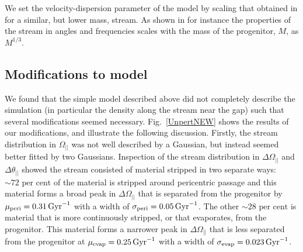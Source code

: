 \documentclass[useAMS,usenatbib,fleqn,a4paper]{mn2e}
\def\Gyr{\,{\rm Gyr}}
\def\percent{\text{ per cent}}
\def\percent{\text{ per cent}}
\begin{document}
We set the velocity-dispersion parameter of the model by scaling that obtained in \cite{Bovy2014} for a similar, but lower mass, stream. As shown in \cite{SandersBinney2013a} for instance the properties of the stream in angles and frequencies scales with the mass of the progenitor, $M$, as $M^{1/3}$.

\subsection{Modifications to model}\label{Sect::modelmods}
We found that the simple model described above did not completely describe the simulation (in particular the density along the stream near the gap) such that several modifications seemed necessary. Fig.~\ref{UnpertNEW} shows the results of our modifications, and illustrate the following discussion. Firstly, the stream distribution in $\Omega_{||}$ was not well described by a Gaussian, but instead seemed better fitted by two Gaussians. Inspection of the stream distribution in $\Delta\Omega_{||}$ and $\Delta\theta_{||}$ showed the stream consisted of material stripped in two separate ways: $\sim72\percent$ of the material is stripped around pericentric passage and this material forms a broad peak in $\Delta\Omega_{||}$ that is separated from the progenitor by $\mu_\mathrm{peri}=0.31\Gyr^{-1}$ with a width of $\sigma_\mathrm{peri}=0.05\Gyr^{-1}$. The other $\sim28\percent$ is material that is more continuously stripped, or that evaporates, from the progenitor. This material forms a narrower peak in $\Delta\Omega_{||}$ that is less separated from the progenitor at $\mu_\mathrm{evap}=0.25\Gyr^{-1}$ with a width of $\sigma_\mathrm{evap}=0.023\Gyr^{-1}$.
\end{document}
